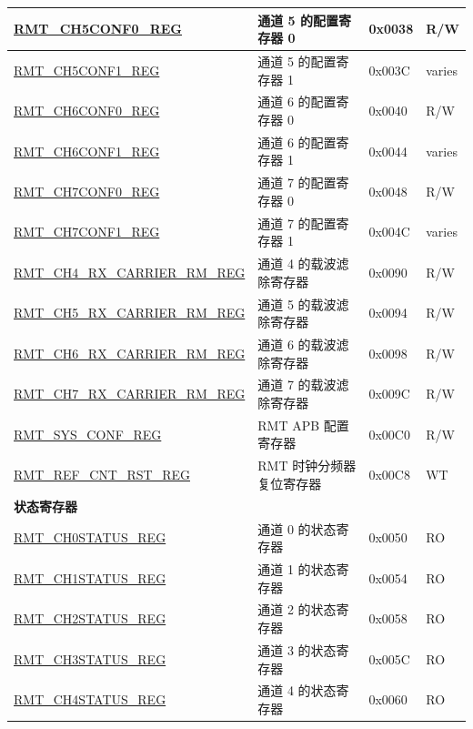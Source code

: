 \begin{longtable}{ | p{5.5cm} | p{6.5cm} | p{1.3cm} | p{1.8cm} | }
\hyperref[regdesc:RMTCHMCONF0REG]{RMT\_CH5CONF0\_REG} & 通道 5 的配置寄存器 0 & 0x0038 & R/W \\ \hline
\hyperref[regdesc:RMTCHMCONF1REG]{RMT\_CH5CONF1\_REG} & 通道 5 的配置寄存器 1 & 0x003C & varies \\ \hline
\hyperref[regdesc:RMTCHMCONF0REG]{RMT\_CH6CONF0\_REG} & 通道 6 的配置寄存器 0 & 0x0040 & R/W \\ \hline
\hyperref[regdesc:RMTCHMCONF1REG]{RMT\_CH6CONF1\_REG} & 通道 6 的配置寄存器 1 & 0x0044 & varies \\ \hline
\hyperref[regdesc:RMTCHMCONF0REG]{RMT\_CH7CONF0\_REG} & 通道 7 的配置寄存器 0 & 0x0048 & R/W \\ \hline
\hyperref[regdesc:RMTCHMCONF1REG]{RMT\_CH7CONF1\_REG} & 通道 7 的配置寄存器 1 & 0x004C & varies \\ \hline
\hyperref[regdesc:RMTCHMRXCARRIERRMREG]{RMT\_CH4\_RX\_CARRIER\_RM\_REG} & 通道 4 的载波滤除寄存器 & 0x0090 & R/W \\ \hline
\hyperref[regdesc:RMTCHMRXCARRIERRMREG]{RMT\_CH5\_RX\_CARRIER\_RM\_REG} & 通道 5 的载波滤除寄存器 & 0x0094 & R/W \\ \hline
\hyperref[regdesc:RMTCHMRXCARRIERRMREG]{RMT\_CH6\_RX\_CARRIER\_RM\_REG} & 通道 6 的载波滤除寄存器 & 0x0098 & R/W \\ \hline
\hyperref[regdesc:RMTCHMRXCARRIERRMREG]{RMT\_CH7\_RX\_CARRIER\_RM\_REG} & 通道 7 的载波滤除寄存器 & 0x009C & R/W \\ \hline
\hyperref[regdesc:RMTSYSCONFREG]{RMT\_SYS\_CONF\_REG} & RMT APB 配置寄存器 & 0x00C0 & R/W \\ \hline
\hyperref[regdesc:RMTREFCNTRSTREG]{RMT\_REF\_CNT\_RST\_REG} & RMT 时钟分频器复位寄存器 & 0x00C8 & WT \\ \hline
\multicolumn{4}{|l|}{\textbf{状态寄存器}} \\ \hline
\hyperref[regdesc:RMTCHNSTATUSREG]{RMT\_CH0STATUS\_REG} & 通道 0 的状态寄存器 & 0x0050 & RO \\ \hline
\hyperref[regdesc:RMTCHNSTATUSREG]{RMT\_CH1STATUS\_REG} & 通道 1 的状态寄存器 & 0x0054 & RO \\ \hline
\hyperref[regdesc:RMTCHNSTATUSREG]{RMT\_CH2STATUS\_REG} & 通道 2 的状态寄存器 & 0x0058 & RO \\ \hline
\hyperref[regdesc:RMTCHNSTATUSREG]{RMT\_CH3STATUS\_REG} & 通道 3 的状态寄存器 & 0x005C & RO \\ \hline
\hyperref[regdesc:RMTCHMSTATUSREG]{RMT\_CH4STATUS\_REG} & 通道 4 的状态寄存器 & 0x0060 & RO \\ \hline

\end{longtable}
